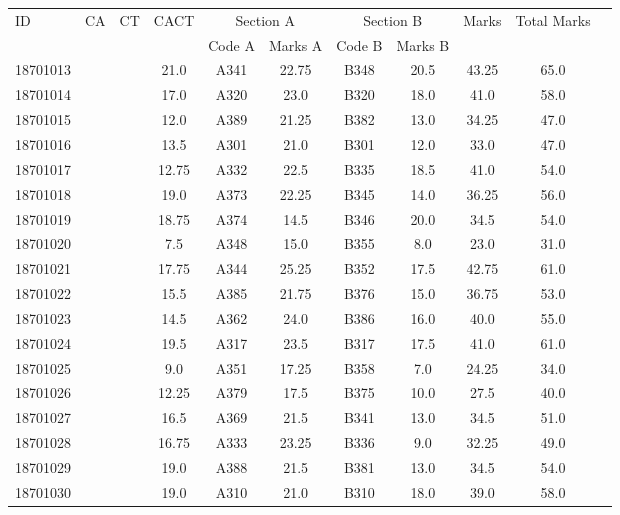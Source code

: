 \documentclass[12pt]{article}
\begin{document}
    \begin{center} 
	\renewcommand{\arraystretch}{1.08}
	\begin{small}
    \begin{tabular}{|l|c|c|c|c|c|c|c|c|c|c|} \hline
	\multirow{2}{*}{ID} & 	\multirow{2}{*}{CA}  & 	\multirow{2}{*}{CT}  & 	\multirow{2}{*}{CACT}  & \multicolumn{2 }{c|}{Section A}& \multicolumn{2 }{c|}{Section B} & 	\multirow{2}{*}{Marks}  & 	\multirow{2}{*}{Total Marks}  \\ 
	&  &  &  & Code A & Marks A & Code B & Marks B&  &  \\ \hline
18701013 &  &  & 21.0 & A341 & 22.75 & B348 & 20.5 & 43.25 & 65.0\\ \hline 
18701014 &  &  & 17.0 & A320 & 23.0 & B320 & 18.0 & 41.0 & 58.0\\ \hline 
18701015 &  &  & 12.0 & A389 & 21.25 & B382 & 13.0 & 34.25 & 47.0\\ \hline 
18701016 &  &  & 13.5 & A301 & 21.0 & B301 & 12.0 & 33.0 & 47.0\\ \hline 
18701017 &  &  & 12.75 & A332 & 22.5 & B335 & 18.5 & 41.0 & 54.0\\ \hline 
18701018 &  &  & 19.0 & A373 & 22.25 & B345 & 14.0 & 36.25 & 56.0\\ \hline 
18701019 &  &  & 18.75 & A374 & 14.5 & B346 & 20.0 & 34.5 & 54.0\\ \hline 
18701020 &  &  & 7.5 & A348 & 15.0 & B355 & 8.0 & 23.0 & 31.0\\ \hline 
18701021 &  &  & 17.75 & A344 & 25.25 & B352 & 17.5 & 42.75 & 61.0\\ \hline 
18701022 &  &  & 15.5 & A385 & 21.75 & B376 & 15.0 & 36.75 & 53.0\\ \hline 
18701023 &  &  & 14.5 & A362 & 24.0 & B386 & 16.0 & 40.0 & 55.0\\ \hline 
18701024 &  &  & 19.5 & A317 & 23.5 & B317 & 17.5 & 41.0 & 61.0\\ \hline 
18701025 &  &  & 9.0 & A351 & 17.25 & B358 & 7.0 & 24.25 & 34.0\\ \hline 
18701026 &  &  & 12.25 & A379 & 17.5 & B375 & 10.0 & 27.5 & 40.0\\ \hline 
18701027 &  &  & 16.5 & A369 & 21.5 & B341 & 13.0 & 34.5 & 51.0\\ \hline 
18701028 &  &  & 16.75 & A333 & 23.25 & B336 & 9.0 & 32.25 & 49.0\\ \hline 
18701029 &  &  & 19.0 & A388 & 21.5 & B381 & 13.0 & 34.5 & 54.0\\ \hline 
18701030 &  &  & 19.0 & A310 & 21.0 & B310 & 18.0 & 39.0 & 58.0\\ \hline 

\end{tabular}
\end{small}
\end{center}
\end{document}
